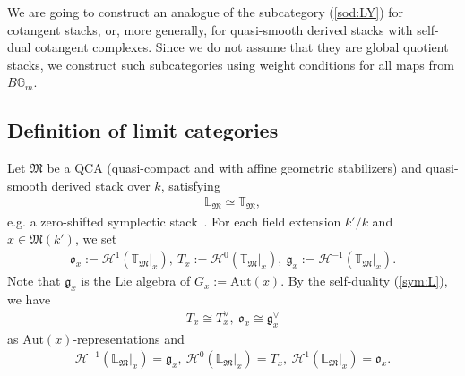 \documentclass [11pt,oneside,a4paper,mathscr]{amsart}
\theoremstyle{definition}
\newcommand{\bgm}{B\mathbb{G}_m}
\begin{document}
We are going to construct an analogue of the subcategory (\ref{sod:LY}) for cotangent 
stacks, or, more generally, for quasi-smooth derived stacks with self-dual cotangent complexes. 
Since we do not assume that they are global quotient stacks, we construct such subcategories using weight conditions for all maps from $\bgm$. 



\subsection{Definition of limit categories}\label{subsec:deflim}
Let $\mathfrak{M}$ be a QCA (quasi-compact and with affine geometric stabilizers) and quasi-smooth 
derived stack over $k$, 
satisfying 
\begin{align}\label{sym:L}
    \mathbb{L}_{\mathfrak{M}} \simeq \mathbb{T}_{\mathfrak{M}},
\end{align}
e.g. a zero-shifted symplectic stack~\cite{PTVV}. 
For each field extension $k'/k$ and $x \in \mathfrak{M}(k')$, 
we set 
\begin{align*}
\mathfrak{o}_x:=
\mathcal{H}^{1}(\mathbb{T}_{\mathfrak{M}}|_{x}), \ 
T_x:=
\mathcal{H}^{0}(\mathbb{T}_{\mathfrak{M}}|_{x}), \ 
\mathfrak{g}_x:=
\mathcal{H}^{-1}(\mathbb{T}_{\mathfrak{M}}|_{x}).
\end{align*}
Note that $\mathfrak{g}_x$ is the Lie algebra of 
$G_x:=\mathrm{Aut}(x)$. By the self-duality (\ref{sym:L}), 
we have 
\begin{align*}
T_x \cong T_x^{\vee}, \ \mathfrak{o}_x \cong \mathfrak{g}_x^{\vee}
    \end{align*}
    as $\mathrm{Aut}(x)$-representations and 
    \begin{align*}
\mathcal{H}^{-1}(\mathbb{L}_{\mathfrak{M}}|_{x})=\mathfrak{g}_x, \ 
\mathcal{H}^0(\mathbb{L}_{\mathfrak{M}}|_{x})=T_x, \ 
\mathcal{H}^1(\mathbb{L}_{\mathfrak{M}}|_{x})=\mathfrak{o}_x. 
\end{align*}
\end{document}
